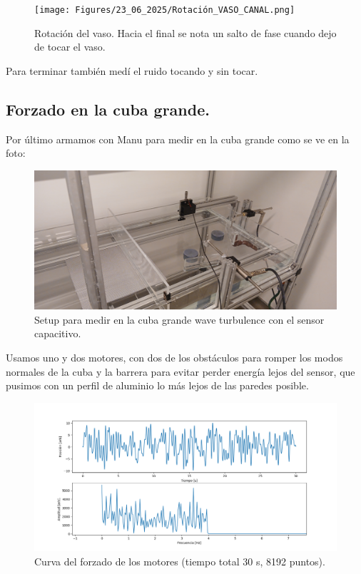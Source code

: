 \begin{figure}[th!]
	\centering
	\texttt{[image: Figures/23\_06\_2025/Rotación\_VASO\_CANAL.png]}
	\caption{Rotación del vaso. Hacia el final se nota un salto de fase cuando dejo de tocar el vaso.}
	\label{fig:rotadovasocanal}
\end{figure}


Para terminar también medí el ruido tocando y sin tocar.


\subsection*{Forzado en la cuba grande.}
Por último armamos con Manu para medir en la cuba grande como se ve en la foto:

\begin{figure}[th!]
	\centering
	\includegraphics[width=0.780257\linewidth]{Figures/23_06_2025/Cuba_forzado_y_sensor}
	\caption{Setup para medir en la cuba grande wave turbulence con el sensor capacitivo. } %
	\label{fig:cubaforzadoysensor}
\end{figure}


Usamos uno y dos motores, con dos de los obstáculos para romper los modos normales de la cuba y la barrera para evitar perder energía lejos del sensor, que pusimos con un perfil de aluminio lo más lejos de las paredes posible.

\begin{figure}[!ht]
	\centering
	\includegraphics[width=0.7065810257\linewidth]{"Figures/23_06_2025/Forzado de los motores"}
	\caption{Curva del forzado de los motores (tiempo total 30 s, 8192 puntos).}
	\label{fig:forzado-de-los-motores}
\end{figure}


